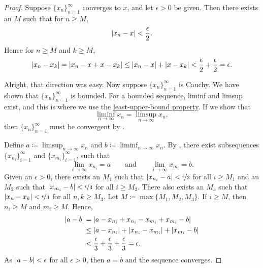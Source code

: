 \begin{proof}
Suppose $\{ x_n \}_{n=1}^\infty$ converges to $x$,
and
let $\epsilon > 0$ be given.
Then there 
exists an $M$ such that for $n \geq M$,
\begin{equation*}
\left\lvert {x_n - x} \right\rvert < \frac{\epsilon}{2} .
\end{equation*}
Hence for $n \geq M$ and $k \geq M$,
\begin{equation*}
\left\lvert {x_n - x_k} \right\rvert = 
\left\lvert {x_n - x + x - x_k} \right\rvert
\leq \left\lvert {x_n-x} \right\rvert + \left\lvert {x-x_k} \right\rvert < \frac{\epsilon}{2} + \frac{\epsilon}{2} =
\epsilon .
\end{equation*}

Alright, that direction was easy.  Now suppose $\{ x_n \}_{n=1}^\infty$ is Cauchy.
We have shown that $\{ x_n \}_{n=1}^\infty$ is bounded.
For a bounded sequence, liminf and limsup exist, and this is
where we use the
\hyperref[defn:lub]{least-upper-bound property}.
If we show that
\begin{equation*}
\liminf_{n\to \infty} x_n = \limsup_{n\to\infty} x_n ,
\end{equation*}
then $\{ x_n \}_{n=1}^\infty$ must be convergent by .


Define $a \coloneqq \limsup_{n\to\infty} x_n$ and
$b \coloneqq \liminf_{n\to\infty} x_n$.
By , there exist subsequences
$\{ x_{n_i} \}_{i=1}^\infty$ and
$\{ x_{m_i} \}_{i=1}^\infty$, such that
\begin{equation*}
\lim_{i\to\infty} x_{n_i} = a
\qquad \text{and} \qquad
\lim_{i\to\infty} x_{m_i} = b.
\end{equation*}
Given an $\epsilon > 0$,
there exists an $M_1$ such that
$\left\lvert {x_{n_i} - a} \right\rvert < \nicefrac{\epsilon}{3}$ for all $i \geq M_1$
and an $M_2$ such that
$\left\lvert {x_{m_i} - b} \right\rvert < \nicefrac{\epsilon}{3}$ for all $i \geq M_2$.
There also exists an $M_3$
such that
$\left\lvert {x_n-x_k} \right\rvert < \nicefrac{\epsilon}{3}$
for all $n,k \geq M_3$.
Let $M \coloneqq \max \{ M_1, M_2, M_3 \}$.
If $i \geq M$, then $n_i \geq M$ and $m_i \geq M$.  Hence,
\begin{equation*}
\begin{split}
\left\lvert {a-b} \right\rvert & =
\left\lvert {a-x_{n_i}+x_{n_i}
-x_{m_i}+x_{m_i}
-b} \right\rvert \\
& \leq
\left\lvert {a-x_{n_i}} \right\rvert
+ \left\lvert {x_{n_i} -x_{m_i}} \right\rvert
+ \left\lvert {x_{m_i} -b} \right\rvert \\
& <
\frac{\epsilon}{3}
+
\frac{\epsilon}{3}
+
\frac{\epsilon}{3}
= \epsilon .
\end{split}
\end{equation*}
As $\left\lvert {a-b} \right\rvert < \epsilon$ for all $\epsilon > 0$, then $a=b$ and 
the sequence converges.
\end{proof}

